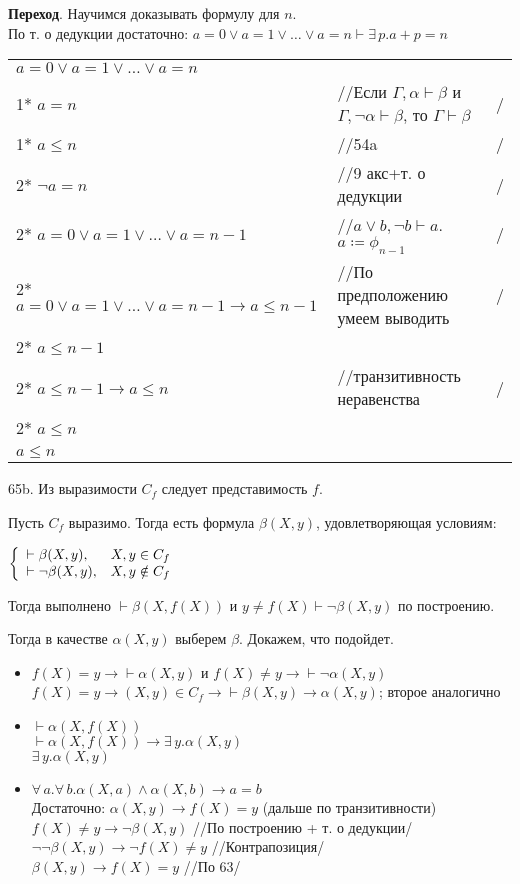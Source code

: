 \documentclass[12pt]{article}
\begin{document}
{\bf Переход}. Научимся доказывать формулу для $n$.\\
По т. о дедукции достаточно: $a=0\vee a=1\vee\ldots\vee a=n\vdash\exists\,p.a+p=n$\\
\begin{tabular*}{\textwidth}{l l l}
	$a=0\vee a=1\vee\ldots\vee a=n$&&\\
	1* $a=n$&//Если $\Gamma,\alpha\vdash\beta$ и $\Gamma,\neg\alpha\vdash\beta$, то $\Gamma\vdash\beta$&/\\
	1* $a\leqslant n$&//54a&/\\
	2* $\neg a=n$&//9 акс+т. о дедукции&/\\
	2* $a=0\vee a=1\vee\ldots\vee a=n-1$&//$a\vee b,\neg b\vdash a$. $a\coloneqq \phi_{n-1}$&/\\
	2* $a=0\vee a=1\vee\ldots\vee a=n-1\to a\leqslant n-1$&//По предположению умеем выводить&/\\
	2* $a\leqslant n-1$&&\\
	2* $a\leqslant n-1\to a\leqslant n$&//транзитивность неравенства&/\\
	2* $a\leqslant n$&&\\
	$a\leqslant n$
\end{tabular*}

\bigskip

65b. Из выразимости $C_f$ следует представимость $f$.

Пусть $C_f$ выразимо. Тогда есть формула $\beta(X,y)$, удовлетворяющая условиям:

$\left\{\begin{array}{l l}
	\vdash\beta(X,y), & X,y\in C_f\\
	\vdash\neg\beta(X,y), & X,y\notin C_f
\end{array}\right.$

Тогда выполнено $\vdash\beta(X,f(X))$ и $y\neq f(X)\vdash\neg\beta(X,y)$ по построению.

Тогда в качестве $\alpha(X,y)$ выберем $\beta$. Докажем, что подойдет.
\begin{itemize}
	\item $f(X)=y\rightarrow\vdash\alpha(X,y)$ и $f(X)\neq y\rightarrow\vdash\neg\alpha(X,y)$\\
	$f(X)=y\rightarrow (X,y)\in C_f\rightarrow\vdash\beta(X,y)\rightarrow\alpha(X,y)$; второе аналогично
	\item $\vdash\alpha(X,f(X))$\\
	$\vdash\alpha(X,f(X))\to\exists\,y.\alpha(X,y)$\\
	$\exists\,y.\alpha(X,y)$
	\item $\forall\,a.\forall\,b.\alpha(X,a)\wedge\alpha(X,b)\to a=b$\\
	Достаточно: $\alpha(X,y)\to f(X)=y$ (дальше по транзитивности)\\
	$f(X)\neq y\to\neg\beta(X,y)$ //По построению + т. о дедукции/\\
	$\neg\neg\beta(X,y)\to\neg f(X)\neq y$ //Контрапозиция/\\
	$\beta(X,y)\to f(X)=y$ //По 63/\\
\end{itemize}
\end{document}
